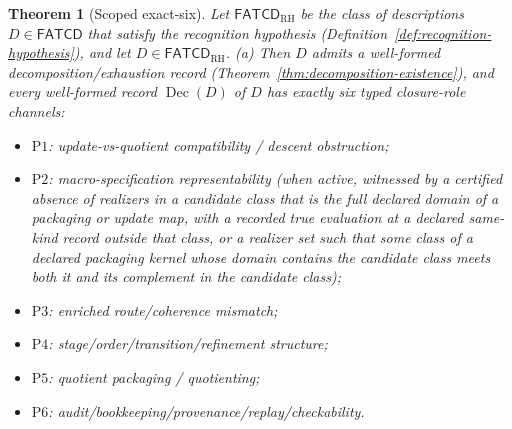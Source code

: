 \documentclass[11pt]{article}
\newtheorem{theorem}{Theorem}[section]
\theoremstyle{definition}
\newcommand{\FATCD}{\ensuremath{\mathsf{FATCD}}}
\newcommand{\Dec}[1]{\ensuremath{\operatorname{Dec}\!\left(#1\right)}}
\newcommand{\Pone}{\ensuremath{\mathrm{P1}}}
\newcommand{\Ptwo}{\ensuremath{\mathrm{P2}}}
\newcommand{\Pthree}{\ensuremath{\mathrm{P3}}}
\newcommand{\Pfour}{\ensuremath{\mathrm{P4}}}
\newcommand{\Pfive}{\ensuremath{\mathrm{P5}}}
\newcommand{\Psix}{\ensuremath{\mathrm{P6}}}
\begin{document}
\begin{theorem}[Scoped exact-six]\label{thm:scoped-exact-six}
Let \(\FATCD_{\mathrm{RH}}\) be the class of descriptions \(D \in \FATCD{}\)
that satisfy the recognition hypothesis
(Definition~\ref{def:recognition-hypothesis}), and let
\(D\in\FATCD_{\mathrm{RH}}\). \textup{(a)} Then \(D\) admits a well-formed
decomposition/exhaustion record (Theorem~\ref{thm:decomposition-existence}),
and every well-formed record \(\Dec{D}\) of \(D\) has exactly six typed
closure-role channels:
\begin{itemize}[topsep=2pt,itemsep=1pt]
  \item \Pone{}: update-vs-quotient compatibility / descent obstruction;
  \item \Ptwo{}: macro-specification representability (when active, witnessed by a certified absence
    of realizers in a candidate class that is the full declared domain of a
    packaging or update map, with a recorded true evaluation at a declared
    same-kind record outside that class, or a realizer set such that some class of a declared
    packaging kernel whose domain contains the candidate class meets both
    it and its complement in the candidate class);
  \item \Pthree{}: enriched route/coherence mismatch;
  \item \Pfour{}: stage/order/transition/refinement structure;
  \item \Pfive{}: quotient packaging / quotienting;
  \item \Psix{}: audit/bookkeeping/provenance/replay/checkability.
\end{itemize}


\end{theorem}
\end{document}
